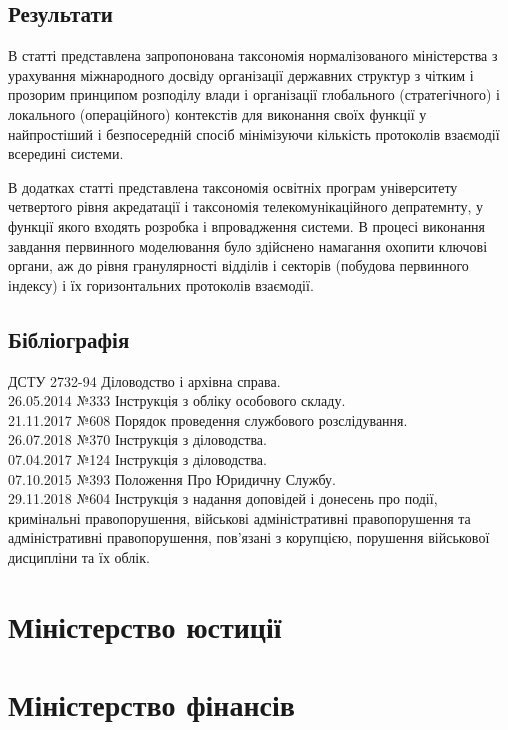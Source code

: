 \subsection{Результати}

В статті представлена запропонована таксономія нормалізованого міністерства з урахування міжнародного досвіду організації державних структур з чітким і прозорим принципом розподілу влади і організації глобального (стратегічного) і локального (операційного) контекстів для виконання своїх функції у найпростіший і безпосередній спосіб мінімізуючи кількість протоколів взаємодії всередині системи.

В додатках статті представлена таксономія освітніх програм університету четвертого рівня акредатації і таксономія телекомунікаційного депратемнту, у функції якого входять розробка і впровадження системи. В процесі виконання завдання первинного моделювання було здійснено намагання охопити ключові органи, аж до рівня гранулярності відділів і секторів (побудова первинного індексу) і їх горизонтальних протоколів взаємодії.

\subsection{Бібліографія}

ДСТУ 2732-94 Діловодство і архівна справа. \\
26.05.2014 №333 Інструкція з обліку особового складу. \\
21.11.2017 №608 Порядок проведення службового розслідування. \\
26.07.2018 №370 Інструкція з діловодства. \\
07.04.2017 №124 Інструкція з діловодства. \\
07.10.2015 №393 Положення Про Юридичну Службу. \\
29.11.2018 №604 Інструкція з надання доповідей і донесень про події,
                кримінальні правопорушення, військові адміністративні
                правопорушення та адміністративні правопорушення,
                пов'язані з корупцією, порушення військової дисципліни та їх облік.

\section{Міністерство юстиції}

\section{Міністерство фінансів}

